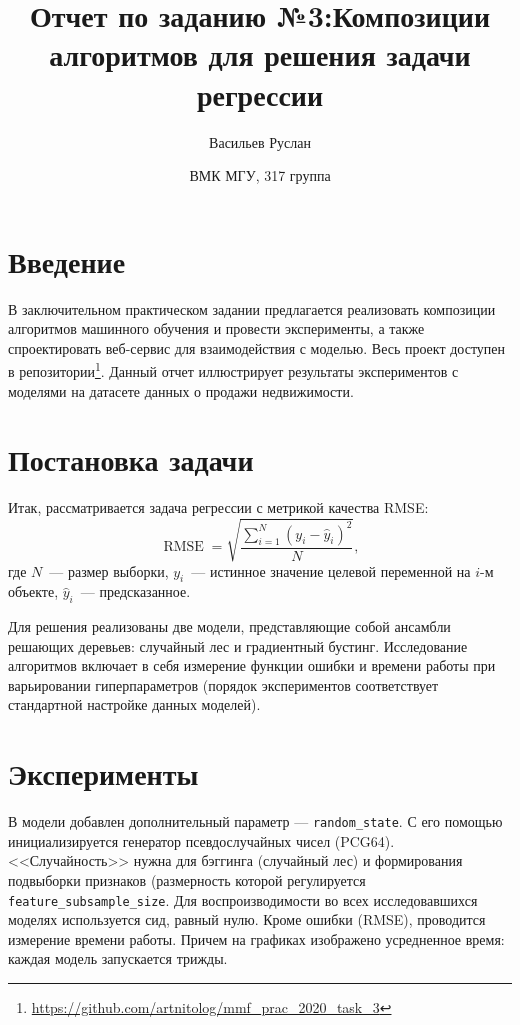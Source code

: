 \documentclass[12pt]{article}
\title{Отчет по заданию №3:\break Композиции алгоритмов для решения \break задачи регрессии}
\author{Васильев Руслан \and{ВМК МГУ, 317 группа}}
\begin{document}
\maketitle
\tableofcontents
\newpage
\section{Введение}
В заключительном практическом задании предлагается реализовать композиции алгоритмов машинного обучения и провести эксперименты, а также спроектировать веб-сервис для взаимодействия с моделью. Весь проект доступен в репозитории\footnote{\url{https://github.com/artnitolog/mmf_prac_2020_task_3}}. Данный отчет иллюстрирует результаты экспериментов с моделями на датасете данных о продажи недвижимости.

\section{Постановка задачи}

Итак, рассматривается задача регрессии с метрикой качества RMSE:
\begin{equation*}
    \operatorname{RMSE} = \sqrt{\frac{\sum_{i=1}^{N} (y_i - \hat{y}_i)^2}{N}},
\end{equation*}
где $N$~--- размер выборки, $y_i$~--- истинное значение целевой переменной на $i$-м объекте, $\hat{y}_i$~--- предсказанное.

Для решения реализованы две модели, представляющие собой ансамбли решающих деревьев: случайный лес и градиентный бустинг. Исследование алгоритмов включает в себя измерение функции ошибки и времени работы при варьировании гиперпараметров (порядок экспериментов соответствует стандартной настройке данных моделей).

\section{Эксперименты}
В модели добавлен дополнительный параметр — \verb|random_state|. С его помощью инициализируется генератор псевдослучайных чисел (PCG64). <<Случайность>> нужна для бэггинга (случайный лес) и формирования подвыборки признаков (размерность которой регулируется \verb|feature_subsample_size|. Для воспроизводимости во всех исследовавшихся моделях используется сид, равный нулю. Кроме ошибки (RMSE), проводится измерение времени работы. Причем на графиках изображено усредненное время: каждая модель запускается трижды.
\end{document}
